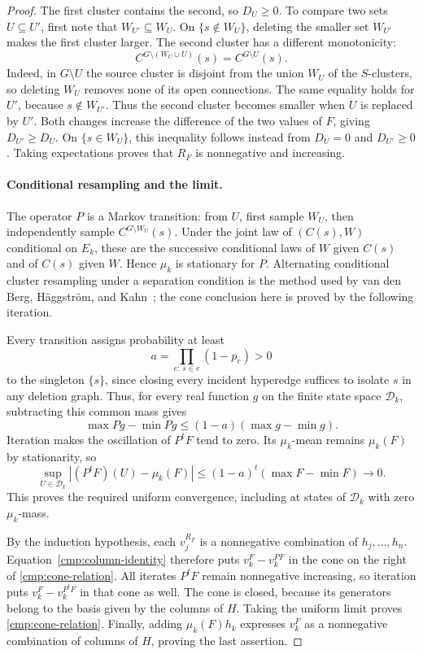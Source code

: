 \begin{proof}
The first cluster contains the second, so $D_U\ge0$. To compare two sets
$U\subseteq U'$, first note that $W_{U'}\subseteq W_U$. On
$\{s\notin W_U\}$, deleting the smaller set $W_{U'}$ makes the first
cluster larger. The second cluster has a different monotonicity:
\[
 C^{G\setminus(W_U\cup U)}(s)=C^{G\setminus U}(s).
\]
Indeed, in $G\setminus U$ the source cluster is disjoint from the union
$W_U$ of the $S$-clusters, so deleting $W_U$ removes none of its open
connections. The same equality holds for $U'$, because $s\notin W_{U'}$.
Thus the second cluster becomes smaller when $U$ is replaced by $U'$.
Both changes increase the difference of the two values of $F$, giving
$D_{U'}\ge D_U$. On $\{s\in W_U\}$, this inequality follows instead from
$D_U=0$ and $D_{U'}\ge0$. Taking expectations proves that $R_F$ is
nonnegative and increasing.

\paragraph{Conditional resampling and the limit.}
The operator $P$ is a Markov transition: from $U$, first sample $W_U$, then
independently sample $C^{G\setminus W_U}(s)$. Under the joint law of
$(C(s),W)$ conditional on $E_k$, these are the successive conditional laws
of $W$ given $C(s)$ and of $C(s)$ given $W$. Hence $\mu_k$ is stationary
for $P$. Alternating conditional cluster resampling under a separation
condition is the method used by van den Berg, H\"aggstr\"om, and
Kahn~\cite[Section~2.1, proof of Theorem~2.1]{BHK2006}; the cone conclusion here is proved by
the following iteration.

Every transition assigns probability at least
\[
 a=\prod_{e:\,s\in e}(1-p_e)>0
\]
to the singleton $\{s\}$, since closing every incident hyperedge suffices
to isolate $s$ in any deletion graph. Thus, for every real function $g$ on
the finite state space $\mathcal D_k$, subtracting this common mass gives
\[
 \max Pg-\min Pg\le(1-a)(\max g-\min g).
\]
Iteration makes the oscillation of $P^tF$ tend to zero. Its $\mu_k$-mean
remains $\mu_k(F)$ by stationarity, so
\[
 \sup_{U\in\mathcal D_k}|(P^tF)(U)-\mu_k(F)|
 \le(1-a)^t(\max F-\min F)\longrightarrow0.
\]
This proves the required uniform convergence, including at states of
$\mathcal D_k$ with zero $\mu_k$-mass.

By the induction hypothesis, each $v_j^{R_F}$ is a nonnegative combination
of $h_j,\ldots,h_n$. Equation~\eqref{cmp:column-identity} therefore puts
$v_k^F-v_k^{PF}$ in the cone on the right of
\eqref{cmp:cone-relation}. All iterates $P^tF$ remain nonnegative increasing,
so iteration puts $v_k^F-v_k^{P^tF}$ in that cone as well. The cone is closed,
because its generators belong to the basis given by the columns of $H$.
Taking the uniform limit proves \eqref{cmp:cone-relation}. Finally, adding
$\mu_k(F)h_k$ expresses $v_k^F$ as a nonnegative combination of columns of
$H$, proving the last assertion.
\end{proof}

